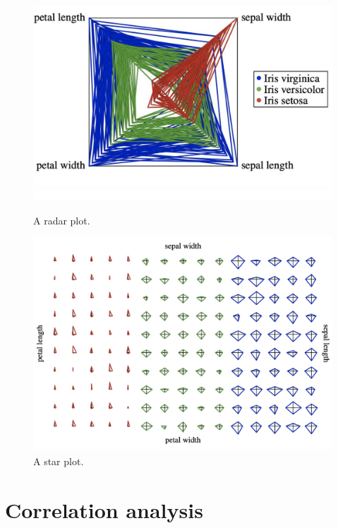 \begin{figure}[h]
    \centering
    \begin{minipage}[b]{0.43\textwidth}
        \includegraphics[width=\textwidth]{img/radar plot.png}
        \caption{A radar plot.}
    \end{minipage}
    \hfill
    \begin{minipage}[b]{0.43\textwidth}
        \includegraphics[width=\textwidth]{img/star plot.png}
        \caption{A star plot.}
    \end{minipage}
\end{figure}

\newpage

\section{Correlation analysis}

